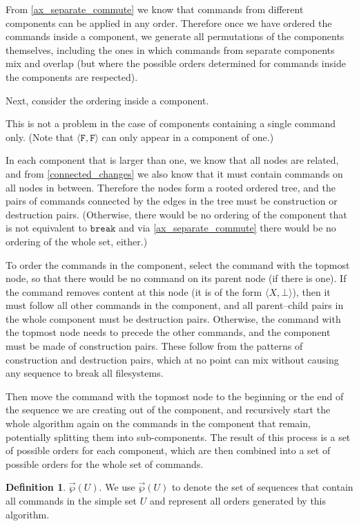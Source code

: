 \documentclass[12pt]{article}
\newcommand{\empt}{\bot}
\newcommand{\cbrk}{\mathtt{break}} %
\newcommand{\ccharb}{\empt}
\newcommand{\ccharf}{\mathtt{F}}
\newcommand{\caa}[2]{\langle{#1,#2}\rangle}
\newcommand{\cff}{\caa{\ccharf}{\ccharf}}
\newcommand{\orderset}[1]{\vec{\wp}({#1})}
\theoremstyle{definition}
\newtheorem{mydef}{Definition}
\begin{document}
From \cref{ax_separate_commute} we know that commands from different 
components can be applied in any order.
Therefore once we have ordered the commands inside a component, we generate
all permutations of the components themselves, including the ones
in which commands from separate components mix and overlap
(but where the possible orders determined for commands inside the components are respected).

Next, consider the ordering inside a component.

This is not a problem in the case of components containing a single command only.
(Note that $\cff$ can only appear in a component of one.)

In each component that is larger than one, 
we know that all nodes are related, and from \cref{connected_changes}
we also know that it must contain commands on all nodes in between.
Therefore the nodes
form a rooted ordered tree,
and the pairs of commands connected by the edges in the tree 
must be construction or destruction pairs.
(Otherwise, there would be no ordering of the component that is not equivalent to $\cbrk$
and via \cref{ax_separate_commute} there would be no ordering of the whole set, either.)

To order the commands in the component,
select the command with the topmost node, so that there would be no command
on its parent node (if there is one). 
If the command removes content at this node (it is of the form $\caa{X}{\ccharb}$), 
then it must follow all other commands in the component, and
all parent--child pairs in the whole component must be destruction pairs.
Otherwise, the command with the topmost node needs to precede the other commands,
and the component must be made of construction pairs.
These follow from the patterns of construction and destruction pairs, which
at no point can mix without causing any sequence to break all filesystems.

Then move the command with the topmost node to the beginning or the end of
the sequence we are creating out of the component,
and recursively start the whole algorithm again on the commands in the component that remain,
potentially splitting them into sub-components.
The result of this process is a set of possible orders for each component,
which are then combined into a set of possible orders for the whole set of commands.

\begin{mydef}{$\orderset{U}$.}
We use $\orderset{U}$ to denote the set of sequences that contain all commands in
the simple set $U$
and represent all orders generated by this algorithm.
\end{mydef}
\end{document}
